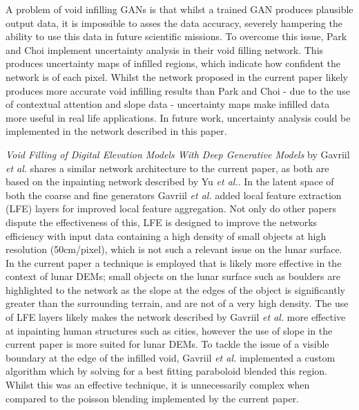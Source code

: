 \documentclass[twocolumn]{article}
\begin{document}
A problem of void infilling GANs is that whilst a trained GAN produces plausible output data, it is impossible to asses the data accuracy, severely hampering the ability to use this data in future scientific missions.
To overcome this issue, Park and Choi implement uncertainty analysis in their void filling network.
This produces uncertainty maps of infilled regions, which indicate how confident the network is of each pixel.
Whilst the network proposed in the current paper likely produces more accurate void infilling results than Park and Choi - due to the use of contextual attention and slope data - uncertainty maps make infilled data more useful in real life applications.
In future work, uncertainty analysis could be implemented in the network described in this paper.

\emph{Void Filling of Digital Elevation Models With Deep Generative Models} by Gavriil \emph{et al.}\autocite{gavriilVoidFillingDigital2019} shares a similar network architecture to the current paper, as both are based on the inpainting network described by Yu \emph{et al.}\autocite{yuGenerativeImageInpainting2018}.
In the latent space of both the coarse and fine generators Gavriil \emph{et al.} added local feature extraction (LFE) layers for improved local feature aggregation.
Not only do other papers dispute the effectiveness of this\autocite{zhangVoidFillingBased2020}, LFE is designed to improve the networks efficiency with input data containing a high density of small objects at high resolution (50cm/pixel)\autocite{hamaguchiEffectiveUseDilated2018}, which is not such a relevant issue on the lunar surface.
In the current paper a technique is employed that is likely more effective in the context of lunar DEMs; small objects on the lunar surface such as boulders are highlighted to the network as the slope at the edges of the object is significantly greater than the surrounding terrain, and are not of a very high density.
The use of LFE layers likely makes the network described by Gavriil \emph{et al.} more effective at inpainting human structures such as cities, however the use of slope in the current paper is more suited for lunar DEMs.
To tackle the issue of a visible boundary at the edge of the infilled void, Gavriil \emph{et al.} implemented a custom algorithm which by solving for a best fitting paraboloid blended this region.
Whilst this was an effective technique, it is unnecessarily complex when compared to the poisson blending\autocite{perezPoissonImageEditing2003} implemented by the current paper.
\end{document}
